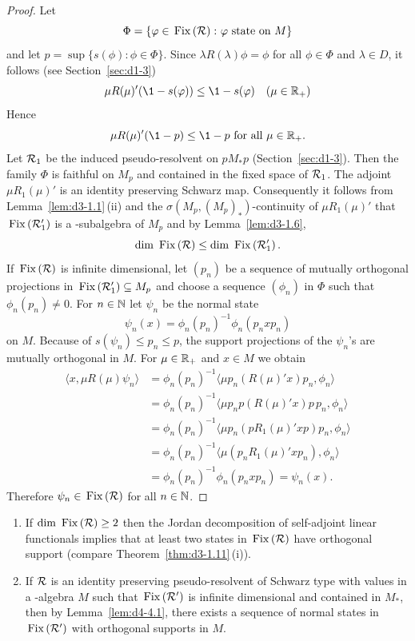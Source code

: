 \begin{proof}
Let 
%
\[
	\Phi = \{\phi \in \Fix{\RR} \colon \phi \text{ state on $ M $}\}  
\]
%
and let 
$ p = \sup\{s(\phi) \colon \phi \in \Phi\} $.
Since 
$ \lambda R(\lambda)\phi = \phi $  
for all $ \phi \in \Phi $  and $ \lambda \in D $,  it follows (see Section~\ref{sec:d1-3}) 
%
\[
	\mu R(\mu)'(\1 - s(\phi)) \leq \1 - s(\phi) \quad (\mu \in \R_{+})
\]
%
Hence 
%
\[
	\mu R(\mu)'(\1 - p) \leq \1 - p    \text{ for all } \mu \in \R_{+} .
\]
%
Let $ \mathcal{R}_{1} $  be the induced pseudo-resolvent on $ pM_{*}p $  (Section~\ref{sec:d1-3}).
Then the family $ \Phi $  is faithful on $ M_{p} $  and contained in the fixed space of\/ $ \mathcal{R}_{1} $.
The adjoint $ \mu R_{1}(\mu)' $  is an identity preserving Schwarz map.
Consequently it follows from Lemma~\ref{lem:d3-1.1}\,(ii) and the $ \sigma(M_{p},(M_{p})_{*}) $-continuity of\/ $ \mu R_{1}(\mu)' $  that $ \mathop{}\mathrm{Fix}\left(\mathcal{R}_{1}'\right) $  is a \WA-subalgebra of\/ $ M_{p} $  and 
by Lemma~\ref{lem:d3-1.6}, 
%
\[
	\dim \Fix{\RR} \leq \dim \Fix{\RR_{1}'} .
\]
%
If\/ $ \mathop{}\mathrm{Fix}\left(\mathcal{R}\right) $  is infinite dimensional, let $ (p_{n}) $  be a sequence of mutually orthogonal projections in 
$ \mathop{}\mathrm{Fix}\left(\mathcal{R}_{1}'\right) \subseteq M_{p} $  and choose a sequence $ (\phi_{n}) $  in $ \Phi $  such that $ \phi_{n}(p_{n}) \neq 0 $.
For $ n \in \mathbb{N} $  let $ \psi_{n} $  be the normal state
\[
\psi_{n}(x) = \phi_{n}(p_{n})^{-1}\phi_{n}(p_{n}xp_{n})
\]
on $ M $.
Because of\/ $ s(\psi_{n}) \leq p_{n} \leq p $, the support projections of the $ \psi_{n} $'s are mutually orthogonal in $ M $.
For $ \mu \in \mathbb{R}_{+} $  and $ x \in M $  we obtain
\[
\begin{aligned}
\langle x,\mu R(\mu)\psi_{n}\rangle &= \phi_{n}(p_{n})^{-1}\langle\mu p_{n}(R(\mu)'x)p_{n},\phi_{n}\rangle \\
&= \phi_{n}(p_{n})^{-1}\langle\mu p_{n}p(R(\mu)'x)p\,p_{n},\phi_{n}\rangle \\
&= \phi_{n}(p_{n})^{-1}\langle\mu p_{n}(pR_{1}(\mu)'xp)p_{n},\phi_{n}\rangle \\
&= \phi_{n}(p_{n})^{-1}\langle\mu(p_{n}R_{1}(\mu)'xp_{n}),\phi_{n}\rangle \\
&= \phi_{n}(p_{n})^{-1}\phi_{n}(p_{n}xp_{n}) = \psi_{n}(x).
\end{aligned}
\]
Therefore $ \psi_{n} \in \mathop{}\mathrm{Fix}\left(\mathcal{R}\right) $  for all $ n \in \mathbb{N} $.
\end{proof}
\begin{remark}\label{rem:d4-4.2}
\begin{enumerate}[\upshape (i), wide, labelindent=.25em]
\item
If\/ $ \dim \Fix{\RR} \geq 2 $  then the Jordan decomposition of self-adjoint linear functionals implies that at least two states in $ \mathop{}\mathrm{Fix}\left(\mathcal{R}\right) $  have orthogonal support (compare Theorem~\ref{thm:d3-1.11}\,(i)).

\item
If\/ $ \mathcal{R} $  is an identity preserving pseudo-resolvent of Schwarz type with values in a \WA-algebra $ M $  such that $ \mathop{}\mathrm{Fix}\left(\mathcal{R}'\right) $  is infinite dimensional and contained in $ M_{*} $,  then by Lemma~\ref{lem:d4-4.1}, there exists a sequence of normal states in $ \mathop{}\mathrm{Fix}\left(\mathcal{R}'\right) $  with orthogonal supports in $ M $.
\end{enumerate}
\end{remark}
